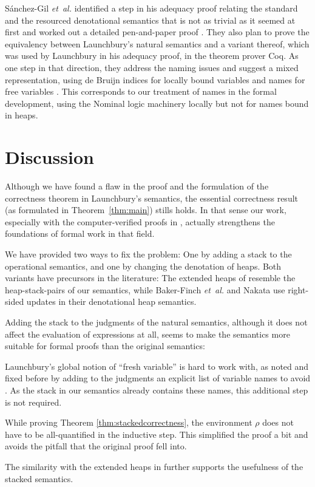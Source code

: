 \documentclass{jfp1}
\theoremstyle{nonumberbreak}
\begin{document}
S{\'a}nchez-Gil {\em et~al.} identified a step in his adequacy proof relating the standard and the resourced denotational semantics that is not as trivial as it seemed at first and worked out a detailed pen-and-paper proof . They also plan to prove the equivalency between Launchbury’s natural semantics and a variant thereof, which was used by Launchbury in his adequacy proof, in the theorem prover Coq. As one step in that direction, they address the naming issues and suggest a mixed representation, using de Bruijn indices for locally bound variables and names for free variables . This corresponds to our treatment of names in the formal development, using the Nominal logic machinery \cite{nominal} locally but not for names bound in heaps.

\section{Discussion}

Although we have found a flaw in the proof and the formulation of the correctness theorem in Launchbury’s semantics, the essential correctness result (as formulated in Theorem~\ref{thm:main}) stills holds. In that sense our work, especially with the computer-verified proofs in \cite{afp}, actually strengthens the foundations of formal work in that field.

We have provided two ways to fix the problem: One by adding a stack to the operational semantics, and one by changing the denotation of heaps. Both variants have precursors in the literature: The extended heaps of \cite{distributed} resemble the heap-stack-pairs of our semantics, while Baker-Finch {\em et~al.}  and Nakata  use right-sided updates in their denotational heap semantics.

Adding the stack to the judgments of the natural semantics, although it does not affect the evaluation of expressions at all, seems to make the semantics more suitable for formal proofs than the original semantics:
\begin{compactitem}
\item Launchbury’s global notion of “fresh variable” is hard to work with, as noted and fixed before by adding to the judgments an explicit list of variable names to avoid \cite{sestoft}. As the stack in our semantics already contains these names, this additional step is not required.
\item While proving Theorem \ref{thm:stackedcorrectness}, the environment $\rho$ does not have to be all-quantified in the inductive step. This simplified the proof a bit and avoids the pitfall that the original proof fell into.
\end{compactitem}
The similarity with the extended heaps in \cite{distributed} further supports the usefulness of the stacked semantics.
\end{document}
